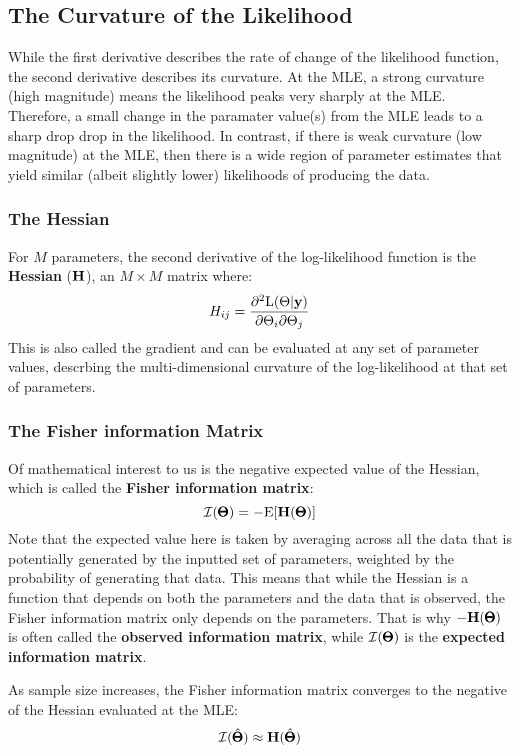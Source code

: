 \documentclass[12pt]{article}
\begin{document}
\subsection{The Curvature of the Likelihood}

While the first derivative describes the rate of change of the likelihood function, the second derivative describes its curvature.
At the MLE, a strong curvature (high magnitude) means the likelihood peaks very sharply at the MLE.
Therefore, a small change in the paramater value(s) from the MLE leads to a sharp drop drop in the likelihood.
In contrast, if there is weak curvature (low magnitude) at the MLE, then there is a wide region of parameter estimates that yield similar (albeit slightly lower) likelihoods of producing the data.

\subsubsection{The Hessian}
For $M$ parameters, the second derivative of the log-likelihood function is the \textbf{Hessian} ($\mathbf{H}$), an $M \times M$ matrix where:
$$
H_{ij} = \frac{ \partial^2 \mathrm{L}(\Theta | \mathbf{y})
    }{ \partial \Theta_i \partial \Theta_j}
$$
This is also called the gradient and can be evaluated at any set of parameter values, descrbing the multi-dimensional curvature of the log-likelihood at that set of parameters.

\subsubsection{The Fisher information Matrix}
Of mathematical interest to us is the negative expected value of the Hessian, which is called the \textbf{Fisher information matrix}:
$$ \mathcal{I}(\pmb{\Theta}) = - \mathrm{E}[ \mathbf{H} (\pmb{\Theta})] $$
Note that the expected value here is taken by averaging across all the data that is potentially generated by the inputted set of parameters, weighted by the probability of generating that data.
This means that while the Hessian is a function that depends on both the parameters and the data that is observed, the Fisher information matrix only depends on the parameters.
That is why $- \mathbf{H}(\pmb{\Theta})$ is often called the \textbf{observed information matrix}, while $\mathcal{I}(\pmb{\Theta})$ is the \textbf{expected information matrix}.

As sample size increases, the Fisher information matrix converges to the negative of the Hessian evaluated at the MLE:
$$ \mathcal{I}(\hat{\pmb{\Theta}}) \approx \mathbf{H}(\hat{\pmb{\Theta}}) $$
\end{document}
